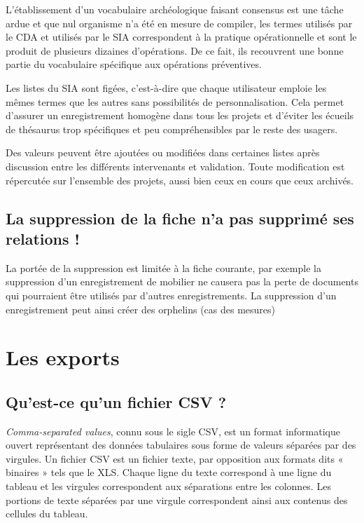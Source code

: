 \documentclass[letterpaper,10pt,french]{sphinxmanual}
\begin{document}
L’établissement d’un vocabulaire archéologique faisant consensus est une tâche ardue et que nul organisme n’a été en mesure de compiler, les termes utilisés par le CDA et utilisés par le SIA correspondent à la pratique opérationnelle et sont le produit de plusieurs dizaines d’opérations. De ce fait, ils recouvrent une bonne partie du vocabulaire spécifique aux opérations préventives.

Les listes du SIA sont figées, c'est-à-dire que chaque utilisateur emploie les mêmes termes que les autres sans possibilités de personnalisation. Cela permet d’assurer un enregistrement homogène dans tous les projets et d’éviter les écueils de thésaurus trop spécifiques et peu compréhensibles par le reste des usagers.

Des valeurs peuvent être ajoutées ou modifiées dans certaines listes après discussion entre les différents intervenants et validation. Toute modification est répercutée sur l’ensemble des projets, aussi bien ceux en cours que ceux archivés.


\subsection{La suppression de la fiche n'a pas supprimé ses relations !}
\label{manuel/questions_frequentes:la-suppression-de-la-fiche-n-a-pas-supprime-ses-relations}
La portée de la suppression est limitée à la fiche courante, par exemple la suppression d'un enregistrement de mobilier ne causera pas la perte de documents qui pourraient être utilisés par d'autres enregistrements. La suppression d'un enregistrement peut ainsi créer des orphelins (cas des mesures)


\section{Les exports}
\label{manuel/questions_frequentes:les-exports}

\subsection{Qu'est-ce qu'un fichier CSV ?}
\label{manuel/questions_frequentes:def-csv}\label{manuel/questions_frequentes:qu-est-ce-qu-un-fichier-csv}
\emph{Comma-separated values}, connu sous le sigle CSV, est un format informatique ouvert représentant des données tabulaires sous forme de valeurs séparées par des virgules. Un fichier CSV est un fichier texte, par opposition aux formats dits « binaires » tels que le XLS. Chaque ligne du texte correspond à une ligne du tableau et les virgules correspondent aux séparations entre les colonnes. Les portions de texte séparées par une virgule correspondent ainsi aux contenus des cellules du tableau.
\end{document}
